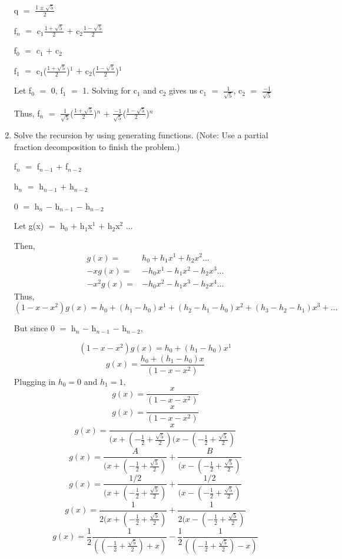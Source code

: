 \documentclass{article}
\newcommand{\mt}[1]{\ensuremath{#1}}
\newcommand{\ps}{\mt{+} }
\newcommand{\ms}{\mt{-} }
\newcommand{\eql}{\mt{=} }
\newcommand{\uw}[2]{#1\mt{_{#2}}}
\newcommand{\uf}[2]{#1\mt{^{#2}}}
\newcommand{\frc}[2]{\mt{\frac{#1}{#2}}}
\newcommand{\eqn}[1]{\[#1\]}
\newcommand{\splt}[1]{\begin{split}#1\end{split}}
\begin{document}
\begin{enumerate}
   q \eql \frc{1 \pm \sqrt{5}}{2}
   
   \uw{f}{n} \eql \uw{c}{1}\frc{1 + \sqrt{5}}{2} \ps \uw{c}{2}\frc{1 - \sqrt{5}}{2}
   
   \uw{f}{0} \eql \uw{c}{1} \ps \uw{c}{2}
   
   \uw{f}{1} \eql \uw{c}{1}\uf{(\frc{1 + \sqrt{5}}{2})}{1} \ps \uw{c}{2}\uf{(\frc{1 - \sqrt{5}}{2})}{1}
   
   Let \uw{f}{0} \eql 0, \uw{f}{1} \eql 1. Solving for \uw{c}{1} and \uw{c}{2} gives us \uw{c}{1} \eql \frc{1}{\sqrt{5}}, \uw{c}{2} \eql \frc{-1}{\sqrt{5}}
   
   Thus, \uw{f}{n} \eql \frc{1}{\sqrt{5}}\uf{(\frc{1 + \sqrt{5}}{2})}{n} \ps \frc{-1}{\sqrt{5}}\uf{(\frc{1 - \sqrt{5}}{2})}{n}
   
   \item Solve the recursion by using generating functions. (Note: Use a partial fraction decomposition to finish the problem.)
   
   \uw{f}{n} \eql \uw{f}{n - 1} \ps \uw{f}{n - 2}
   
   \uw{h}{n} \eql \uw{h}{n - 1} \ps \uw{h}{n - 2}
   
   0 \eql \uw{h}{n} \ms \uw{h}{n - 1} \ms \uw{h}{n - 2}
   
   Let g(x) \eql \uw{h}{0} \ps \uw{h}{1}\uf{x}{1} \ps \uw{h}{2}\uf{x}{2} ... 
   
   Then,
   \eqn{
   		\splt{
   			g(x) = &  \uw{h}{0} \ps \uw{h}{1}\uf{x}{1} \ps \uw{h}{2}\uf{x}{2} ... \\
   			-xg(x) = & -h_0x^1 - h_1x^2 - h_2x^3 ... \\
   			-x^2g(x) = & -h_0x^2 - h_1x^3 - h_2x^4 ...
   		}
   }
   Thus,
   \eqn{(1 - x - x^2)g(x) = h_0 + (h_1 - h_0)x^1 + (h_2 - h_1 - h_0)x^2 + (h_3 - h_2 - h_1)x^3 + ...}
   
   But since 0 \eql \uw{h}{n} \ms \uw{h}{n - 1} \ms \uw{h}{n - 2},
   
   \eqn{(1 - x - x^2)g(x) = h_0 + (h_1 - h_0)x^1}
   \eqn{g(x) = \frac{h_0 + (h_1 - h_0)x}{(1 - x - x^2)}}
   Plugging in \mt{h_0 = 0} and \mt{h_1 = 1},
   \eqn{g(x) = \frac{x}{(1 - x - x^2)}}
   \eqn{g(x) = \frac{x}{(1 - x - x^2)}}
   \eqn{g(x) = \frac{x}{(x + (-\frac{1}{2} + \frac{\sqrt{5}}{2})(x - (-\frac{1}{2} + \frac{\sqrt{5}}{2})}}
   \eqn{g(x) = \frac{A}{(x + (-\frac{1}{2} + \frac{\sqrt{5}}{2})} + \frac{B}{(x - (-\frac{1}{2} + \frac{\sqrt{5}}{2})}}
   \eqn{g(x) = \frac{1/2}{(x + (-\frac{1}{2} + \frac{\sqrt{5}}{2})} + \frac{1/2}{(x - (-\frac{1}{2} + \frac{\sqrt{5}}{2})}}
   \eqn{g(x) = \frac{1}{2(x + (-\frac{1}{2} + \frac{\sqrt{5}}{2})} + \frac{1}{2(x - (-\frac{1}{2} + \frac{\sqrt{5}}{2})}}
   \eqn{g(x) = \frac{1}{2}\frac{1}{((-\frac{1}{2} + \frac{\sqrt{5}}{2}) + x)}  -\frac{1}{2}\frac{1}{((-\frac{1}{2} + \frac{\sqrt{5}}{2}) - x)}}
   

\end{enumerate}
\end{document}
